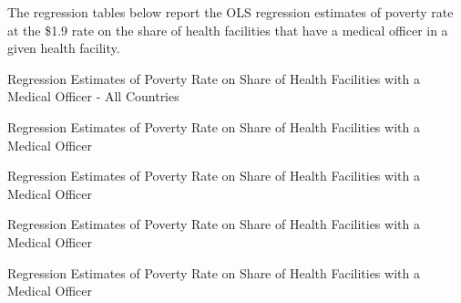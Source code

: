 \documentclass{article}                 %
\begin{document}
		The regression tables below report the OLS regression estimates of poverty rate at the \$1.9 rate on the share of health facilities that have a medical officer in a given health facility.
	
			\begin{table}[H]
				\centering
				\caption{Regression Estimates of Poverty Rate on Share of Health Facilities with a Medical Officer - All Countries}
					\begin{adjustbox}{max width=\textwidth}
						
					\end{adjustbox}	
			\end{table}	
		
			\begin{table}[H]
				\centering
				\caption{Regression Estimates of Poverty Rate on Share of Health Facilities with a Medical Officer}
						\begin{adjustbox}{max width=\textwidth}
							
						\end{adjustbox}	
			\end{table}	

			\begin{table}[H]
				\centering
				\caption{Regression Estimates of Poverty Rate on Share of Health Facilities with a Medical Officer}
						\begin{adjustbox}{max width=\textwidth}
							
						\end{adjustbox}	
			\end{table}	
		
			\begin{table}[H]
				\centering
				\caption{Regression Estimates of Poverty Rate on Share of Health Facilities with a Medical Officer}
						\begin{adjustbox}{max width=\textwidth}
							
						\end{adjustbox}	
			\end{table}	
		
			\begin{table}[H]
				\centering
				\caption{Regression Estimates of Poverty Rate on Share of Health Facilities with a Medical Officer}
					\begin{adjustbox}{max width=\textwidth}
						
					\end{adjustbox}	
			\end{table}	
		
\end{document}
